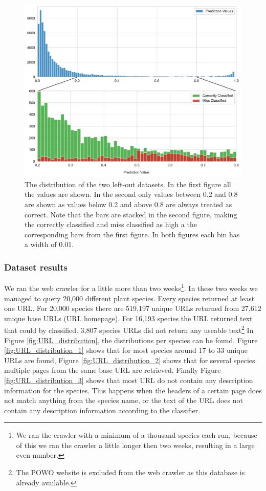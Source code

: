 \documentclass[a4paper, 12pt, oneside]{book} %
\begin{document}
\begin{figure}[htpb]
 \centering
 \includegraphics[width=\textwidth]{figures/predictionvalues_external.pdf}
 \caption[Prediction values of left-out datasets]{The distribution of the two left-out datasets. In the first figure all the values are shown. In the second only values between 0.2 and 0.8 are shown as values below 0.2 and above 0.8 are always treated as correct. Note that the bars are stacked in the second figure, making the correctly classified and miss classified as high a the corresponding bars from the first figure. In both figures each bin has a width of 0.01.}
 \label{fig:predictionvalues_external}
\end{figure}

\subsubsection{Dataset results}
We ran the web crawler for a little more than two weeks\footnote{We ran the crawler with a minimum of a thousand species each run, because of this we ran the crawler a little longer then two weeks, resulting in a large even number.}.
In these two weeks we managed to query 20,000 different plant species.
Every species returned at least one URL.
For 20,000 species there are 519,197 unique URLs returned from 27,612 unique base URLs (URL homepage).
For 16,193 species the URL returned text that could by classified.
3,807 species URLs did not return any useable text\footnote{The POWO website is excluded from the web crawler as this database is already available.}
In Figure \ref{fig:URL_distribution}, the distributions per species can be found.
Figure \ref{fig:URL_distribution_1} shows that for most species around 17 to 33 unique URLs are found, Figure \ref{fig:URL_distribution_2} shows that for several species multiple pages from the same base URL are retrieved.
Finally Figure \ref{fig:URL_distribution_3} shows that most URL do not contain any description information for the species.
This happens when the headers of a certain page does not match anything from the species name, or the text of the URL does not contain any description information according to the classifier.
\end{document}

